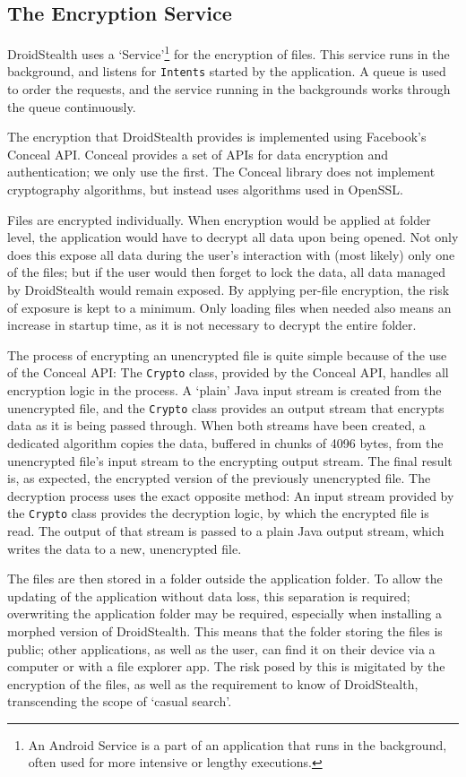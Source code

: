 \subsection{The Encryption Service}
\label{sec:implementation:encryption}
DroidStealth uses a `Service'\footnote{An Android Service is a part of an application that runs in the background, often used for more intensive or lengthy executions.} for the encryption of files.
This service runs in the background, and listens for \texttt{Intents} started by the application.
A queue is used to order the requests, and the service running in the backgrounds works through the queue continuously.

The encryption that DroidStealth provides is implemented using Facebook's Conceal API\cite{facebookConceal}.
Conceal provides a set of APIs for data encryption and authentication; we only use the first.
The Conceal library does not implement cryptography algorithms, but instead uses algorithms used in OpenSSL\cite{openssl}.

Files are encrypted individually.
When encryption would be applied at folder level, the application would have to decrypt all data upon being opened.
Not only does this expose all data during the user's interaction with (most likely) only one of the files;
but if the user would then forget to lock the data, all data managed by DroidStealth would remain exposed.
By applying per-file encryption, the risk of exposure is kept to a minimum.
Only loading files when needed also means an increase in startup time, as it is not necessary to decrypt the entire folder.

The process of encrypting an unencrypted file is quite simple because of the use of the Conceal API:
The \texttt{Crypto} class, provided by the Conceal API, handles all encryption logic in the process.
A `plain' Java input stream is created from the unencrypted file, and the \texttt{Crypto} class provides an output stream that encrypts data as it is being passed through.
When both streams have been created, a dedicated algorithm copies the data, buffered in chunks of 4096 bytes, from the unencrypted file's input stream to the encrypting output stream.
The final result is, as expected, the encrypted version of the previously unencrypted file.
The decryption process uses the exact opposite method:
An input stream provided by the \texttt{Crypto} class provides the decryption logic, by which the encrypted file is read.
The output of that stream is passed to a plain Java output stream, which writes the data to a new, unencrypted file.

The files are then stored in a folder outside the application folder.
To allow the updating of the application without data loss, this separation is required; overwriting the application folder may be required, especially when installing a morphed version of DroidStealth.
This means that the folder storing the files is public; other applications, as well as the user, can find it on their device via a computer or with a file explorer app.
The risk posed by this is migitated by the encryption of the files, as well as the requirement to know of DroidStealth, transcending the scope of `casual search'.
